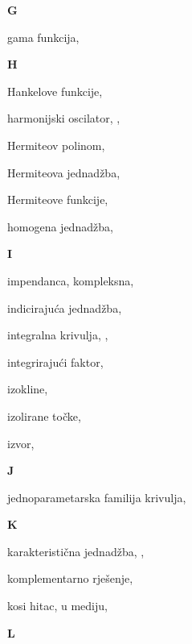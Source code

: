 \begin{theindex}
  \indexspace
{\bfseries\hfil G\hfil}\nopagebreak

  \item gama funkcija, 

  \indexspace
{\bfseries\hfil H\hfil}\nopagebreak

  \item Hankelove funkcije, 
  \item harmonijski oscilator, , 
  \item Hermiteov polinom, 
  \item Hermiteova jednad\v zba, 
  \item Hermiteove funkcije, 
  \item homogena jednad\v zba, 

  \indexspace
{\bfseries\hfil I\hfil}\nopagebreak

  \item impendanca, 
    \subitem kompleksna, 
  \item indiciraju\'ca jednad\v zba, 
  \item integralna krivulja, , 
  \item integriraju\'ci faktor, 
  \item izokline, 
  \item izolirane to\v cke, 
  \item izvor, 

  \indexspace
{\bfseries\hfil J\hfil}\nopagebreak

  \item jednoparametarska familija krivulja, 

  \indexspace
{\bfseries\hfil K\hfil}\nopagebreak

  \item karakteristi\v cna jednad\v zba, , 
  \item komplementarno rje\v senje, 
  \item kosi hitac, 
    \subitem u mediju, 

  \indexspace
{\bfseries\hfil L\hfil}\nopagebreak


\end{theindex}
